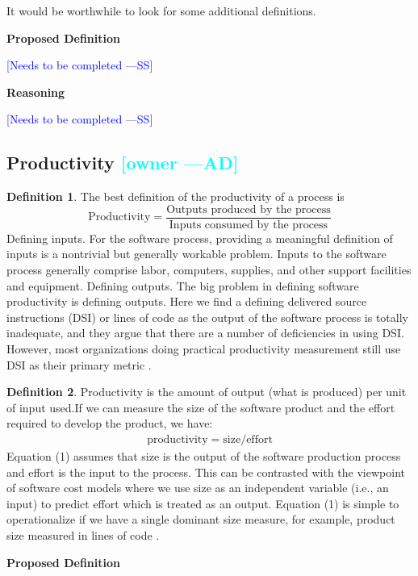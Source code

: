 \documentclass[letterpaper,cleveref]{lipics-v2019}
\newcommand{\authornote}[3]{\textcolor{#1}{[#3 ---#2]}}
\newcommand{\authornote}[3]{}
\newcommand{\wss}[1]{\authornote{blue}{SS}{#1}} %
\newcommand{\ad}[1]{\authornote{cyan}{AD}{#1}} %
\theoremstyle{definition}
\newtheorem{defn}{Definition}
\begin{document}
It would be worthwhile to look for some additional definitions.

\noindent \textbf{Proposed Definition} 

\wss{Needs to be completed}

\noindent \textbf{Reasoning}

\wss{Needs to be completed}

\subsection{Productivity \ad{owner}}

\begin{defn}
The best definition of the productivity of a process is
\[\text{Productivity} = \dfrac{\text{Outputs produced by the
process}}{\text{Inputs consumed by the process}}\]
Defining inputs. For the software process, providing a meaningful definition of
inputs is a nontrivial but generally workable problem. Inputs to the software
process generally comprise labor, computers, supplies, and other support
facilities and equipment. Defining outputs. The big problem in defining software
productivity is defining outputs. Here we find a defining delivered source
instructions (DSI) or lines of code as the output of the software process is
totally inadequate, and they argue that there are a number of deficiencies in
using DSI. However, most organizations doing practical productivity measurement
still use DSI as their primary metric \citep{Boehm1987}.
\end{defn}
\begin{defn}
\label{ProductivitySelected}
Productivity is the amount of output (what is produced) per unit of input
used.If we can measure the size of the software product and the effort required
to develop the product, we have:
\begin{align}
\text{productivity} = \text{size}/\text{effort}
\end{align}
Equation (1) assumes that size is the output of the software production process
and effort is the input to the process. This can be contrasted with the
viewpoint of software cost models where we use size as an independent variable
(i.e., an input) to predict effort which is treated as an output. Equation (1)
is simple to operationalize if we have a single dominant size measure, for
example, product size measured in lines of code \citep{Kitchenham2004}.
\end{defn}

\noindent \textbf{Proposed Definition} 
\end{document}
